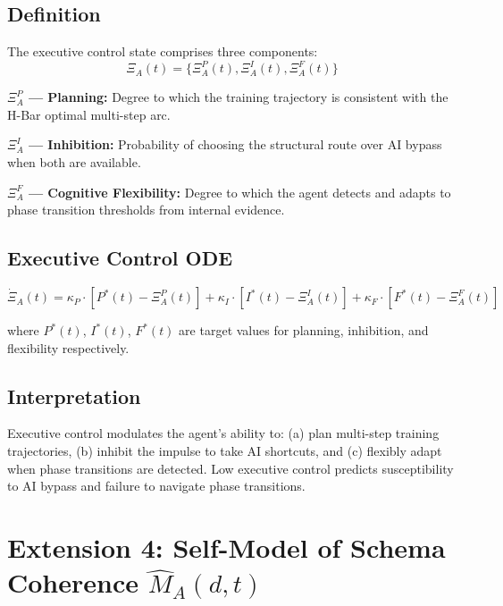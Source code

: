 \documentclass[11pt,a4paper]{article}
\begin{document}
\subsection{Definition}

The executive control state comprises three components:
\begin{equation}\label{app:eq:executive-state}
\Xi_A(t) = \{\Xi_A^P(t), \Xi_A^I(t), \Xi_A^F(t)\}
\end{equation}

\textbf{$\Xi_A^P$ --- Planning:} Degree to which the training trajectory
is consistent with the H-Bar optimal multi-step arc.

\textbf{$\Xi_A^I$ --- Inhibition:} Probability of choosing the structural
route over AI bypass when both are available.

\textbf{$\Xi_A^F$ --- Cognitive Flexibility:} Degree to which the agent
detects and adapts to phase transition thresholds from internal evidence.

\subsection{Executive Control ODE}

\begin{equation}\label{app:eq:executive-ode}
\dot{\Xi}_A(t) = \kappa_P \cdot [P^*(t) - \Xi_A^P(t)] + \kappa_I \cdot [I^*(t) - \Xi_A^I(t)] + \kappa_F \cdot [F^*(t) - \Xi_A^F(t)]
\end{equation}

where $P^*(t)$, $I^*(t)$, $F^*(t)$ are target values for planning,
inhibition, and flexibility respectively.

\subsection{Interpretation}

Executive control modulates the agent's ability to: (a) plan multi-step
training trajectories, (b) inhibit the impulse to take AI shortcuts,
and (c) flexibly adapt when phase transitions are detected. Low
executive control predicts susceptibility to AI bypass and failure
to navigate phase transitions.

\section{Extension 4: Self-Model of Schema Coherence $\hat{M}_A(d,t)$}\label{app:metacognition}
\end{document}
